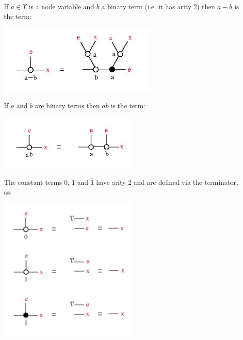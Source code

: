 \documentclass{article}
\begin{document}
\begin{definition}
If $a \in \Upsilon$ is a node variable and $b$ a binary term (i.e. it has arity 2) then $\displaystyle a-b$ is the term: 

\vspace{.5cm} 
\centerline{\includegraphics[width=80mm]{jpg/a-b.jpg}} \vspace{.5cm} 


If $a$ and $b$ are binary terms then $\displaystyle ab$ is the term: 

\vspace{.5cm} 
\centerline{\includegraphics[width=70mm]{jpg/ab.jpg}} \vspace{.5cm} 

The constant terms $0$, $1$ and $\displaystyle \bar{1}$ have arity 2 and are defined via the terminator, as: 

\vspace{.5cm} 
\centerline{\includegraphics[width=70mm]{jpg/0.jpg}} \vspace{.5cm} 

\label{ddifprod}
\end{definition}
\end{document}
